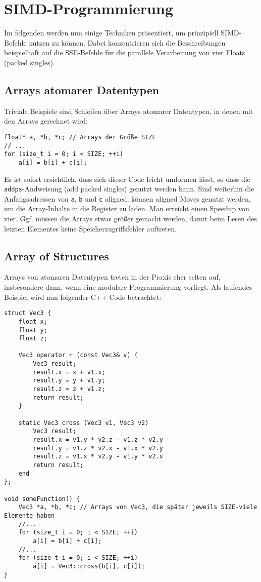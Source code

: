 \documentclass[a4paper,10pt]{article}
\begin{document}
\newpage
\section{SIMD-Programmierung}

Im folgenden werden nun einige Techniken präsentiert, um prinzipiell SIMD-Befehle nutzen zu können.
Dabei konzentrieren sich die Beschreibungen beispielhaft auf die SSE-Befehle für die parallele
Verarbeitung von vier Floats (packed singles). 

\subsection{Arrays atomarer Datentypen}

Triviale Beispiele sind Schleifen über Arrays atomarer Datentypen, in denen mit den Arrays
gerechnet wird:

\begin{verbatim}
float* a, *b, *c; // Arrays der Größe SIZE
// ...
for (size_t i = 0; i < SIZE; ++i)
    a[i] = b[i] + c[i];
\end{verbatim}

Es ist sofort ersichtlich, dass sich dieser Code leicht umformen lässt, so dass die
\texttt{addps}-Andweisung (add packed singles) genutzt werden kann. Sind weiterhin die
Anfangsadressen von \texttt{a}, \texttt{b} und \texttt{c} aligned, können aligned Moves genutzt
werden, um die Array-Inhalte in die Register zu laden. Man erreicht einen Speedup von vier. Ggf.
müssen die Arrays etwas größer gemacht werden, damit beim Lesen des letzten Elementes keine
Speicherzugriffsfehler auftreten.

\subsection{Array of Structures}

Arrays von atomaren Datentypen treten in der Praxis eher selten auf, insbesondere dann, wenn eine
modulare Programmierung vorliegt. Als laufendes Beispiel wird nun folgender C++ Code betrachtet:

\begin{verbatim}
struct Vec3 {
    float x;
    float y;
    float z;

    Vec3 operator + (const Vec3& v) {
        Vec3 result;
        result.x = x + v1.x;
        result.y = y + v1.y;
        result.z = z + v1.z;
        return result;
    }

    static Vec3 cross (Vec3 v1, Vec3 v2)
        Vec3 result;
        result.x = v1.y * v2.z - v1.z * v2.y
        result.y = v1.z * v2.x - v1.x * v2.y
        result.z = v1.x * v2.y - v1.y * v2.x
        return result;
    end
};

void someFunction() {
    Vec3 *a, *b, *c; // Arrays von Vec3, die später jeweils SIZE-viele Elemente haben
    //...
    for (size_t i = 0; i < SIZE; ++i)
        a[i] = b[i] + c[i];
    //...
    for (size_t i = 0; i < SIZE; ++i)
        a[i] = Vec3::cross(b[i], c[i]);
}
\end{verbatim}
\end{document}
